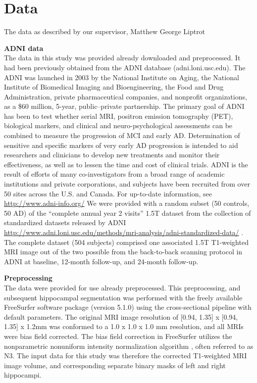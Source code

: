 \chapter{Data}
The data as described by our supervisor, Matthew George Liptrot
 
\textbf{ADNI data}\\
The data in this study was provided already downloaded and preprocessed. It had been previously obtained from the ADNI database (adni.loni.usc.edu). The ADNI was launched in 2003 by the National Institute on Aging, the National Institute of Biomedical Imaging and Bioengineering, the Food and Drug Administration, private pharmaceutical companies, and nonprofit organizations, as a \$60 million, 5-year, public–private partnership. The primary goal of ADNI has been to test whether serial MRI, positron emission tomography (PET), biological markers, and clinical and neuro-psychological assessments can be combined to measure the progression of MCI and early AD. Determination of sensitive and specific markers of very early AD progression is intended to aid researchers and clinicians to develop new treatments and monitor their effectiveness, as well as to lessen the time and cost of clinical trials. ADNI is the result of efforts of many co-investigators from a broad range of academic institutions and private corporations, and subjects have been recruited from over 50 sites across the U.S. and Canada. For up-to-date information, see \href{http://www.adni-info.org/}{http://www.adni-info.org/}
We were provided with a random subset (50 controls, 50 AD) of the “complete annual year 2 visits” 1.5T dataset from the collection of standardized datasets released by ADNI \href{http://www.adni.loni.usc.edu/methods/mri-analysis/adni-standardized-data/}{http://www.adni.loni.usc.edu/methods/mri-analysis/adni-standardized-data/} \cite{wyman2013standardization}. The complete dataset (504 subjects) comprised one associated 1.5T T1-weighted MRI image out of the two possible from the back-to-back scanning protocol in ADNI \cite{jack2008alzheimer} at baseline, 12-month follow-up, and 24-month follow-up.

\textbf{Preprocessing}\\
The data were provided for use already preprocessed. This preprocessing, and subsequent hippocampal segmentation was performed with the freely available FreeSurfer software package (version 5.1.0) \cite{fischl2002whole} using the cross-sectional pipeline with default parameters. The original MRI image resolution of [0.94, 1.35] x [0.94, 1.35] x 1.2mm was conformed to a 1.0 x 1.0 x 1.0 mm resolution, and all MRIs were bias field corrected. The bias field correction in FreeSurfer utilizes the nonparametric nonuniform intensity normalization algorithm \cite{sled1998nonparametric}, often referred to as N3. The input data for this study was therefore the corrected T1-weighted MRI image volume, and corresponding separate binary masks of left and right hippocampi. 